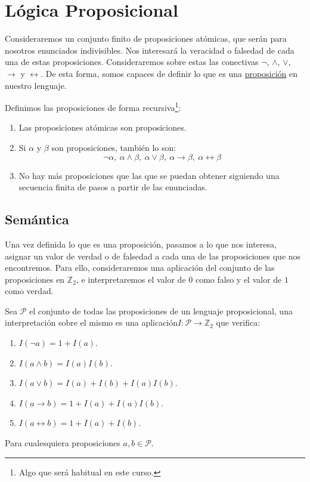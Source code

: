 \chapter{Lógica Proposicional}
Consideraremos un conjunto finito de proposiciones atómicas, que serán para nosotros enunciados indivisibles. Nos interesará la veracidad o falsedad de cada una de estas proposiciones. Consideraremos sobre estas las conectivas $\lnot$, $\land$, $\lor$, $\to$ y $\leftrightarrow$. De esta forma, somos capaces de definir lo que es una \underline{proposición} en nuestro lenguaje.

\begin{definicion}[Proposición]
    Definimos las proposiciones de forma recursiva\footnote{Algo que será habitual en este curso.}:
    \begin{enumerate}
        \item Las proposiciones atómicas son proposiciones.
        \item Si $\alpha$ y $\beta$ son proposiciones, también lo son:
            \begin{equation*}
                \lnot\alpha,\ \alpha\land\beta,\ \alpha\lor\beta,\ \alpha\to\beta,\ \alpha\leftrightarrow\beta
            \end{equation*}
        \item No hay más proposiciones que las que se puedan obtener siguiendo una secuencia finita de pasos a partir de las enunciadas.
    \end{enumerate}
\end{definicion}

\section{Semántica}
Una vez definida lo que es una proposición, pasamos a lo que nos interesa, asignar un valor de verdad o de falsedad a cada una de las proposiciones que nos encontremos. Para ello, consideraremos una aplicación del conjunto de las proposiciones en $\mathbb{Z}_2$, e interpretaremos el valor de $0$ como falso y el valor de $1$ como verdad.

\begin{definicion}[Interpretación]
    Sea $\mathcal{P}$ el conjunto de todas las proposiciones de un lenguaje proposicional, una interpretación sobre el mismo es una aplicación\newline $I:\mathcal{P}\rightarrow\mathbb{Z}_2$ que verifica:
    \begin{enumerate}
        \item $I(\lnot a) = 1+ I(a)$.
        \item $I(a\land b) = I(a)I(b)$.
        \item $I(a\lor b) = I(a) + I(b) + I(a)I(b)$.
        \item $I(a\to b) = 1 + I(a) + I(a)I(b)$.
        \item $I(a\leftrightarrow b) = 1 + I(a) + I(b)$.
    \end{enumerate}
    Para cualesquiera proposiciones $a,b\in \mathcal{P}$.
\end{definicion}

